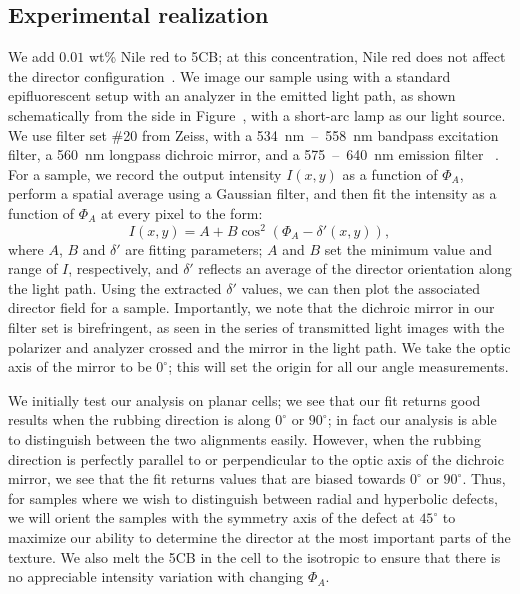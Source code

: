 \subsection{Experimental realization}
We add $0.01$ wt\% Nile red to 5CB; at this concentration, Nile red does not affect the director configuration~\cite{RN173}.
We image our sample using with a standard epifluorescent setup with an analyzer in the emitted light path, as shown schematically from the side in Figure~, with a short-arc lamp as our light source.
We use filter set \#20 from Zeiss, with a 534~nm~--~558~nm bandpass excitation filter, a 560~nm longpass dichroic mirror, and a 575~--~640~nm emission filter ~\cite{RN288}.
For a sample, we record the output intensity $I(x,y)$ as a function of $\Phi_A$, perform a spatial average using a Gaussian filter, and then fit the intensity as a function of $\Phi_A$ at every pixel to the form:
\begin{equation}
    I(x,y) = A + B \cos^2{(\Phi_A-\delta'(x,y))},\label{e:5-IntFit}
\end{equation}
where $A$, $B$ and $\delta'$ are fitting parameters; $A$ and $B$ set the minimum value and range of $I$, respectively, and $\delta'$ reflects an average of the director orientation along the light path.
Using the extracted $\delta'$ values, we can then plot the associated director field for a sample.
Importantly, we note that the dichroic mirror in our filter set is birefringent, as seen in the series of transmitted light images with the polarizer and analyzer crossed and the mirror in the light path. We take the optic axis of the mirror to be $0^{\circ}$; this will set the origin for all our angle measurements.

We initially test our analysis on planar cells; we see that our fit returns good results when the rubbing direction is along $0^{\circ}$ or $90^{\circ}$; in fact our analysis is able to distinguish between the two alignments easily.
However, when the rubbing direction is perfectly parallel to or perpendicular to the optic axis of the dichroic mirror, we see that the fit returns values that are biased towards $0^{\circ}$ or $90^{\circ}$.
Thus, for samples where we wish to distinguish between radial and hyperbolic defects, we will orient the samples with the symmetry axis of the defect at $45^{\circ}$ to maximize our ability to determine the director at the most important parts of the texture.
We also melt the 5CB in the cell to the isotropic to ensure that there is no appreciable intensity variation with changing $\Phi_A$.



